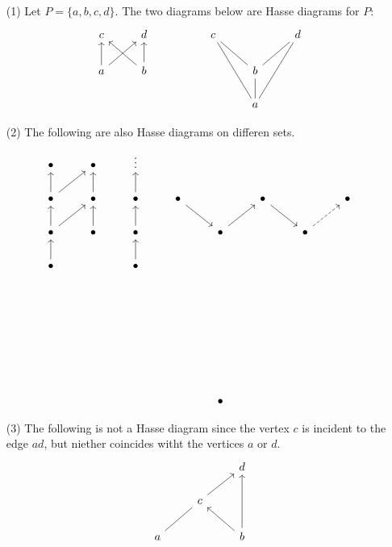 \begin{example}\label{example_1.7}
  \begin{enumerate}
    \item[(1)] Let $P=\{a,b,c,d\}$. The two diagrams below are Hasse
      diagrams for $P$:
      \[\begin{tikzcd}
        c & d && c && d \\
        a & b &&& b \\
          &&&& a
          \arrow[from=2-1, to=1-1]
          \arrow[from=2-1, to=1-2]
          \arrow[from=2-2, to=1-1]
          \arrow[from=2-2, to=1-2]
          \arrow[no head, from=2-5, to=1-4]
          \arrow[no head, from=2-5, to=1-6]
          \arrow[no head, from=3-5, to=1-4]
          \arrow[no head, from=3-5, to=1-6]
          \arrow[no head, from=3-5, to=2-5]
      \end{tikzcd}\]

    \item[(2)] The following are also Hasse diagrams on differen sets.
      \[\begin{tikzcd}
        \bullet & \bullet & \vdots \\
        \bullet & \bullet & \bullet & \bullet && \bullet && \bullet \\
        \bullet & \bullet & \bullet && \bullet && \bullet \\
        \bullet && \bullet \\
        \\
        \\
        \\
        \\
        \\
        &&&& \bullet
        \arrow[from=2-1, to=1-1]
        \arrow[from=2-1, to=1-2]
        \arrow[from=2-2, to=1-2]
        \arrow[from=2-3, to=1-3]
        \arrow[from=2-4, to=3-5]
        \arrow[from=2-6, to=3-7]
        \arrow[from=3-1, to=2-1]
        \arrow[from=3-1, to=2-2]
        \arrow[from=3-2, to=2-2]
        \arrow[from=3-3, to=2-3]
        \arrow[from=3-5, to=2-6]
        \arrow[dashed, from=3-7, to=2-8]
        \arrow[from=4-1, to=3-1]
        \arrow[from=4-3, to=3-3]
      \end{tikzcd}\]

    \item[(3)] The following is not a Hasse diagram since the vertex
      $c$ is incident to the edge $ad$, but niether coincides witht
      the vertices $a$ or $d$.
      \[\begin{tikzcd}
          && d \\
          & c \\
        a && b
        \arrow[from=2-2, to=1-3]
        \arrow[no head, from=3-1, to=2-2]
        \arrow[from=3-3, to=1-3]
        \arrow[from=3-3, to=2-2]
      \end{tikzcd}\]


\end{enumerate}
\end{example}
